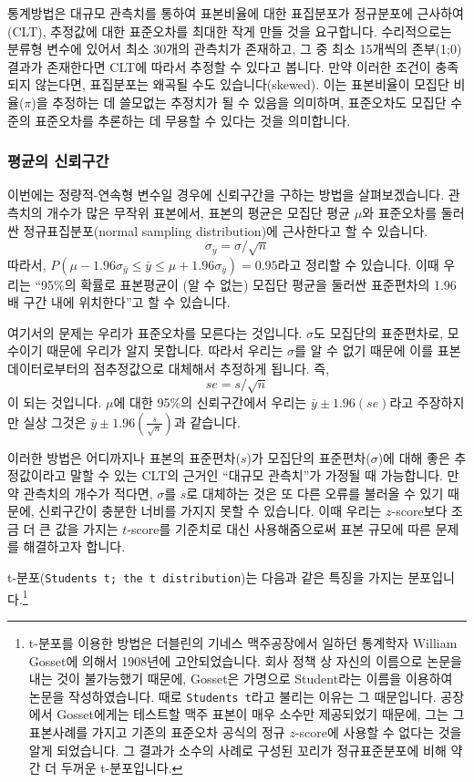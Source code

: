 \documentclass[]{book}
\let\rmarkdownfootnote\footnote%
\def\footnote{\protect\rmarkdownfootnote}
\begin{document}
통계방법은 대규모 관측치를 통하여 표본비율에 대한 표집분포가 정규분포에 근사하여(CLT), 추정값에 대한 표준오차를 최대한 작게 만들 것을 요구합니다. 수리적으로는 분류형 변수에 있어서 최소 30개의 관측치가 존재하고, 그 중 최소 15개씩의 존부(1;0) 결과가 존재한다면 CLT에 따라서 추정할 수 있다고 봅니다. 만약 이러한 조건이 충족되지 않는다면, 표집분포는 왜곡될 수도 있습니다(skewed). 이는 표본비율이 모집단 비율(\(\pi\))을 추정하는 데 쓸모없는 추정치가 될 수 있음을 의미하며, 표준오차도 모집단 수준의 표준오차를 추론하는 데 무용할 수 있다는 것을 의미합니다.

\hypertarget{uxd3c9uxade0uxc758-uxc2e0uxb8b0uxad6cuxac04}{%
\subsubsection{평균의 신뢰구간}\label{uxd3c9uxade0uxc758-uxc2e0uxb8b0uxad6cuxac04}}

이번에는 정량적-연속형 변수일 경우에 신뢰구간을 구하는 방법을 살펴보겠습니다. 관측치의 개수가 많은 무작위 표본에서, 표본의 평균은 모집단 평균 \(\mu\)와 표준오차를 둘러싼 정규표집분포(normal sampling distribution)에 근사한다고 할 수 있습니다.
\[\sigma_{\bar{y}} = \sigma / \sqrt{n}\]
따라서, \(P(\mu - 1.96\sigma_{\bar{y}} \leq \bar{y} \leq \mu + 1.96\sigma_{\bar{y}}) = 0.95\)라고 정리할 수 있습니다. 이때 우리는 ``95\%의 확률로 표본평균이 (알 수 없는) 모집단 평균을 둘러싼 표준편차의 1.96배 구간 내에 위치한다''고 할 수 있습니다.

여기서의 문제는 우리가 표준오차를 모른다는 것입니다. \(\sigma\)도 모집단의 표준편차로, 모수이기 때문에 우리가 알지 못합니다. 따라서 우리는 \(\sigma\)를 알 수 없기 때문에 이를 표본 데이터로부터의 점추정값으로 대체해서 추정하게 됩니다. 즉, \[se = s / \sqrt{n}\]이 되는 것입니다. \(\mu\)에 대한 95\%의 신뢰구간에서 우리는 \(\bar{y}\pm1.96(se)\)라고 주장하지만 실상 그것은 \(\bar{y}\pm1.96(\frac{s}{\sqrt{n}})\)과 같습니다.

이러한 방법은 어디까지나 표본의 표준편차(\(s\))가 모집단의 표준편차(\(\sigma\))에 대해 좋은 추정값이라고 말할 수 있는 CLT의 근거인 ``대규모 관측치''가 가정될 때 가능합니다. 만약 관측치의 개수가 적다면, \(\sigma\)를 \(s\)로 대체하는 것은 또 다른 오류를 불러올 수 있기 때문에, 신뢰구간이 충분한 너비를 가지지 못할 수 있습니다. 이때 우리는 \(z\)-score보다 조금 더 큰 값을 가지는 \(t\)-score를 기준치로 대신 사용해줌으로써 표본 규모에 따른 문제를 해결하고자 합니다.

t-분포(\texttt{Student\textquotesingle{}s\ t;\ the\ t\ distribution})는 다음과 같은 특징을 가지는 분포입니다.\footnote{t-분포를 이용한 방법은 더블린의 기네스 맥주공장에서 일하던 통계학자 William Gosset에 의해서 1908년에 고안되었습니다. 회사 정책 상 자신의 이름으로 논문을 내는 것이 불가능했기 때문에, Gosset은 가명으로 Student라는 이름을 이용하여 논문을 작성하였습니다. 때로 \texttt{Student\textquotesingle{}s\ t}라고 불리는 이유는 그 때문입니다. 공장에서 Gosset에게는 테스트할 맥주 표본이 매우 소수만 제공되었기 때문에, 그는 그 표본사례를 가지고 기존의 표준오차 공식의 정규 \(z\)-score에 사용할 수 없다는 것을 알게 되었습니다. 그 결과가 소수의 사례로 구성된 꼬리가 정규표준분포에 비해 약간 더 두꺼운 t-분포입니다.}
\end{document}
